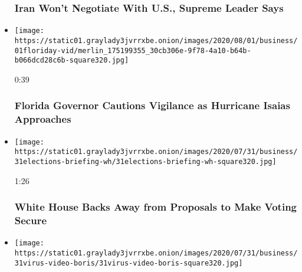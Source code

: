 \begin{itemize}
{  \subsubsection{Iran Won't Negotiate With U.S., Supreme Leader
  Says}\label{iran-wont-negotiate-with-us-supreme-leader-says-1}}
\item
  \href{https://www.nytimes3xbfgragh.onion/video/us/100000007268424/desantis-florida-hurricane-isaias.html?action=click\&module=video-series-bar\&region=header\&pgtype=Article\&playlistId=video/latest-video}{}

  \texttt{[image: https://static01.graylady3jvrrxbe.onion/images/2020/08/01/business/01floriday-vid/merlin\_175199355\_30cb306e-9f78-4a10-b64b-b066dcd28c6b-square320.jpg]}

  0:39

  \hypertarget{florida-governor-cautions-vigilance-as-hurricane-isaias-approaches}{%
  \subsubsection{Florida Governor Cautions Vigilance as Hurricane Isaias
  Approaches}\label{florida-governor-cautions-vigilance-as-hurricane-isaias-approaches}}
\item
  \href{https://www.nytimes3xbfgragh.onion/video/us/100000007267362/white-house-mail-in-ballots-election.html?action=click\&module=video-series-bar\&region=header\&pgtype=Article\&playlistId=video/latest-video}{}

  \texttt{[image: https://static01.graylady3jvrrxbe.onion/images/2020/07/31/business/31elections-briefing-wh/31elections-briefing-wh-square320.jpg]}

  1:26

  \hypertarget{white-house-backs-away-from-proposals-to-make-voting-secure}{%
  \subsubsection{White House Backs Away from Proposals to Make Voting
  Secure}\label{white-house-backs-away-from-proposals-to-make-voting-secure}}
\item
  \href{https://www.nytimes3xbfgragh.onion/video/us/politics/100000007266983/johnson-coronavirus-restrictions.html?action=click\&module=video-series-bar\&region=header\&pgtype=Article\&playlistId=video/latest-video}{}

  \texttt{[image: https://static01.graylady3jvrrxbe.onion/images/2020/07/31/business/31virus-video-boris/31virus-video-boris-square320.jpg]}


\end{itemize}

